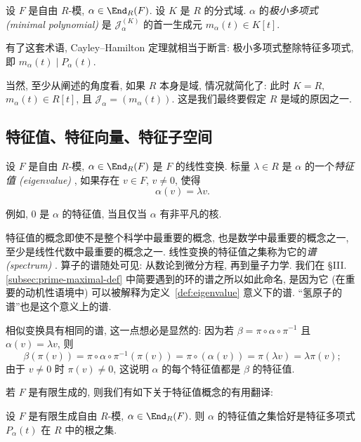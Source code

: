 \begin{definition}\label{def:minimal-polynomial}
设 $F$ 是自由 $R$-模, $\alpha\in\End_R(F)$. 设 $K$ 是 $R$ 的分式域. $\alpha$ 的\emph{极小多项式 (minimal polynomial)}
是 $\mathcal{J}_\alpha^{(K)}$ 的首一生成元 $m_\alpha(t)\in K[t]$.
\end{definition}

有了这套术语, Cayley--Hamilton 定理就相当于断言: 极小多项式整除特征多项式, 即 $m_\alpha(t)\mid P_\alpha(t)$.

当然, 至少从阐述的角度看, 如果 $R$ 本身是域, 情况就简化了: 此时 $K=R$, $m_\alpha(t)\in R[t]$, 且 $\mathcal{J}_\alpha=(m_\alpha(t))$. 这是我们最终要假定 $R$ 是域的原因之一.

\subsection{特征值、特征向量、特征子空间}
\label{subsec:eigenvalues-eigenvectors}

\begin{definition}\label{def:eigenvalue}
设 $F$ 是自由 $R$-模, $\alpha\in\End_R(F)$ 是 $F$ 的线性变换. 标量 $\lambda\in R$ 是 $\alpha$ 的一个\emph{特征值 (eigenvalue)}
, 如果存在 $v\in F$, $v\neq0$, 使得
\[
\alpha(v)=\lambda v.
\]
\end{definition}

例如, $0$ 是 $\alpha$ 的特征值, 当且仅当 $\alpha$ 有非平凡的核.

特征值的概念即使不是整个科学中最重要的概念, 也是数学中最重要的概念之一, 至少是线性代数中最重要的概念之一. 线性变换的特征值之集称为它的\emph{谱 (spectrum)}
. 算子的谱随处可见: 从数论到微分方程, 再到量子力学. 我们在 §III.\ref{subsec:prime-maximal-def} 中简要遇到的环的谱之所以如此命名, 是因为它 (在重要的动机性语境中) 可以被解释为定义~\ref{def:eigenvalue} 意义下的谱. ``氢原子的谱''也是这个意义上的谱.

相似变换具有相同的谱, 这一点想必是显然的: 因为若 $\beta=\pi\circ\alpha\circ\pi^{-1}$ 且 $\alpha(v)=\lambda v$, 则
\[
\beta(\pi(v))=\pi\circ\alpha\circ\pi^{-1}(\pi(v))=\pi\circ(\alpha(v))=\pi(\lambda v)=\lambda\pi(v);
\]
由于 $v\neq0$ 时 $\pi(v)\neq0$, 这说明 $\alpha$ 的每个特征值都是 $\beta$ 的特征值.

若 $F$ 是有限生成的, 则我们有如下关于特征值概念的有用翻译:

\begin{lemma}\label{lem:eigenvalue-as-root}
设 $F$ 是有限生成自由 $R$-模, $\alpha\in\End_R(F)$. 则 $\alpha$ 的特征值之集恰好是特征多项式 $P_\alpha(t)$ 在 $R$ 中的根之集.
\end{lemma}

